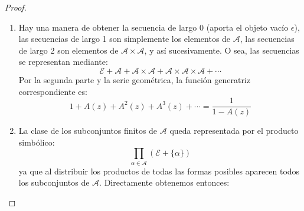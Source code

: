 \begin{proof}
\begin{enumerate}
      Alternativamente:
      \begin{align*}
        \sum_{\mathclap{\gamma \in \mathscr{A} \times \mathscr{B}}}
             z^{\lvert \gamma \rvert}
          = \sum_{\mathclap{\substack{
                              \alpha \in \mathscr{A} \\
                              \beta \in \mathscr{B}
                 }}} z^{\lvert (\alpha, \beta) \rvert}
          = \sum_{\mathclap{\substack{
                              \alpha \in \mathscr{A} \\
                              \beta \in \mathscr{B}
                 }}} z^{\lvert \alpha \rvert + \lvert \beta \rvert}
          = \left(
               \sum_{\alpha \in \mathscr{A}}
                 z^{\lvert \alpha \rvert}
             \right)
               \cdot \left(
                        \sum_{\beta \in \mathscr{B}}
                          z^{\lvert \beta \rvert}
                     \right)
          = A(z) \cdot B(z)
      \end{align*}
    \item %
      Hay una manera de obtener la secuencia de largo 0
      (aporta el objeto vacío \(\epsilon\)),
      las secuencias de largo \num{1}
      son simplemente los elementos de \(\mathscr{A}\),
      las secuencias de largo \num{2}
      son elementos de \(\mathscr{A} \times \mathscr{A}\),
      y así sucesivamente.
      O sea,
      las secuencias se representan mediante:
      \begin{equation*}
        \mathscr{E}
          + \mathscr{A}
          + \mathscr{A} \times \mathscr{A}
          + \mathscr{A} \times \mathscr{A} \times \mathscr{A}
          + \dotsb
      \end{equation*}
      Por la segunda parte
      y la serie geométrica,
      la función generatriz correspondiente es:
      \begin{equation*}
        1 + A(z) + A^2(z) + A^3(z) + \dotsb
          = \frac{1}{1 - A(z)}
      \end{equation*}
    \item %
      La clase de los subconjuntos finitos de \(\mathscr{A}\)
      queda representada por el producto simbólico:
      \begin{equation*}
        \prod_{\alpha \in \mathscr{A}} (\mathscr{E} + \{\alpha\})
      \end{equation*}
      ya que
      al distribuir los productos de todas las formas posibles
      aparecen todos los subconjuntos de \(\mathscr{A}\).
      Directamente obtenemos entonces:

\end{enumerate}
\end{proof}
